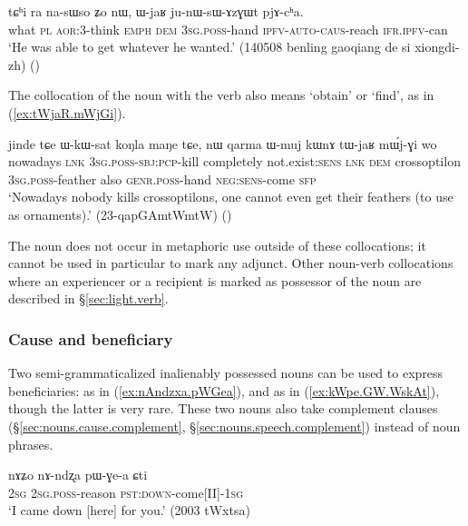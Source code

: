 \begin{exe}
\ex \label{ex:WjaR.junWsAzGWt}
\gll tɕʰi ra na-sɯso ʑo nɯ, ɯ-jaʁ ju-nɯ-sɯ-ɤzɣɯt pjɤ-cʰa.  \\
what \textsc{pl} \textsc{aor}:3\flobv{}-think \textsc{emph} \textsc{dem} \textsc{3sg}.\textsc{poss}-hand \textsc{ipfv}-\textsc{auto}-\textsc{caus}-reach \textsc{ifr}.\textsc{ipfv}-can \\
\glt  `He was able to get whatever he wanted.' (140508 benling gaoqiang de si xiongdi-zh) ()
\end{exe}

The collocation of the noun  with the verb  also means `obtain' or `find', as in (\ref{ex:tWjaR.mWjGi}).

\begin{exe}
\ex \label{ex:tWjaR.mWjGi}
\gll jinde tɕe ɯ-kɯ-sat koŋla maŋe tɕe, nɯ qarma ɯ-muj kɯnɤ tɯ-jaʁ mɯ́j-ɣi wo\\
nowadays \textsc{lnk} \textsc{3sg}.\textsc{poss}-\textsc{sbj}:\textsc{pcp}-kill completely not.exist:\textsc{sens} \textsc{lnk} \textsc{dem} crossoptilon \textsc{3sg}.\textsc{poss}-feather also \textsc{genr}.\textsc{poss}-hand \textsc{neg}:\textsc{sens}-come \textsc{sfp}\\
\glt `Nowadays nobody kills crossoptilons, one cannot even get their feathers (to use as ornaments).' (23-qapGAmtWmtW)
()
\end{exe}

The noun  does not occur in metaphoric use outside of these collocations; it cannot be used in particular to mark any adjunct. Other noun-verb collocations where an experiencer or a recipient is marked as possessor of the noun are described in §\ref{sec:light.verb}.


\subsubsection{Cause and beneficiary} \label{sec:IPN.cause}
Two semi-grammaticalized inalienably possessed nouns can be used to express beneficiaries:  as in (\ref{ex:nAndzxa.pWGea}), and  as in (\ref{ex:kWpe.GW.WskAt}), though the latter is very rare. These two nouns also take complement clauses (§\ref{sec:nouns.cause.complement}, §\ref{sec:nouns.speech.complement}) instead of noun phrases.

\begin{exe}
\ex \label{ex:nAndzxa.pWGea}
\gll nɤʑo nɤ-ndʐa pɯ-ɣe-a ɕti \\
\textsc{2sg} \textsc{2sg}.\textsc{poss}-reason \textsc{pst}:\textsc{down}-come[II]-\textsc{1sg} \\
\glt `I came down [here] for you.' (2003 tWxtsa)
\end{exe}

